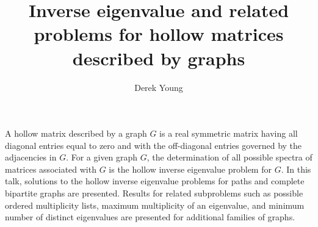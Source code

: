 \documentclass[a4paper]{amsart}
\date{}
\begin{document}
\title{Inverse eigenvalue and related problems for hollow matrices described by graphs}
\author{Derek Young} %
\address{Mount Holyoke College} %

\maketitle

A hollow matrix described by a graph $G$ is a  real symmetric matrix having all
diagonal entries equal to zero and with the off-diagonal entries governed by
the adjacencies in $G$.   For a given graph $G$, the determination  of all
possible spectra of  matrices associated with $G$ is the hollow inverse
eigenvalue problem for $G$. In this talk, solutions to the hollow inverse
eigenvalue problems for paths and complete bipartite graphs are presented.
Results for related subproblems such as possible ordered multiplicity lists,
maximum multiplicity of an eigenvalue, and minimum number of distinct
eigenvalues are presented for additional families of graphs. 
\end{document}
